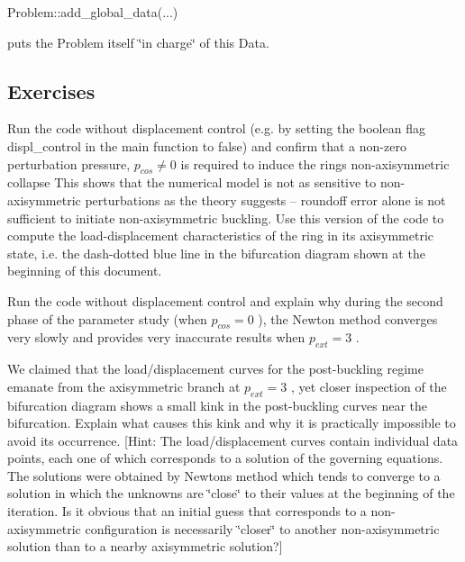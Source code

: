 \begin{DoxyCode}
Problem::add\_global\_data(...)
\end{DoxyCode}


puts the {\ttfamily Problem} itself \char`\"{}in charge\char`\"{} of this {\ttfamily Data}.



\hypertarget{index_exercises}{}\subsection{Exercises}\label{index_exercises}

\begin{DoxyEnumerate}
\item Run the code without displacement control (e.\+g. by setting the boolean flag {\ttfamily displ\+\_\+control} in the main function to {\ttfamily false}) and confirm that a non-\/zero perturbation pressure, $ p_{cos} \ne 0$ is required to induce the ring\textquotesingle{}s non-\/axisymmetric collapse This shows that the numerical model is not as sensitive to non-\/axisymmetric perturbations as the theory suggests -- roundoff error alone is not sufficient to initiate non-\/axisymmetric buckling. Use this version of the code to compute the load-\/displacement characteristics of the ring in its axisymmetric state, i.\+e. the dash-\/dotted blue line in the bifurcation diagram shown at the beginning of this document. ~\newline
~\newline

\item Run the code without displacement control and explain why during the second phase of the parameter study (when $ p_{cos} = 0 $ ), the Newton method converges very slowly and provides very inaccurate results when $ p_{ext} = 3$ .~\newline
~\newline

\item We claimed that the load/displacement curves for the post-\/buckling regime emanate from the axisymmetric branch at $ p_{ext} = 3 $ , yet closer inspection of the bifurcation diagram shows a small kink in the post-\/buckling curves near the bifurcation. Explain what causes this kink and why it is practically impossible to avoid its occurrence. \mbox{[}Hint\+: The load/displacement curves contain individual data points, each one of which corresponds to a solution of the governing equations. The solutions were obtained by Newton\textquotesingle{}s method which tends to converge to a solution in which the unknowns are \char`\"{}close\char`\"{} to their values at the beginning of the iteration. Is it obvious that an initial guess that corresponds to a non-\/axisymmetric configuration is necessarily \char`\"{}closer\char`\"{} to another non-\/axisymmetric solution than to a nearby axisymmetric solution?\mbox{]} ~\newline
~\newline


\end{DoxyEnumerate}
